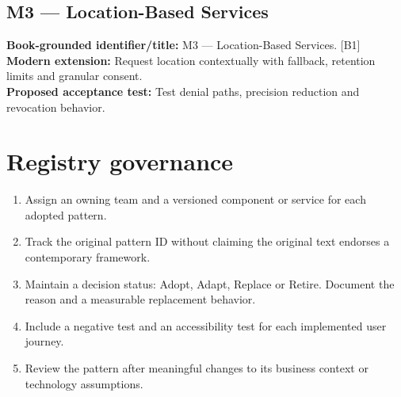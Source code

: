 \documentclass[11pt]{article}
\begin{document}
\subsection{M3 — Location-Based Services}
\noindent\textcolor{Ocean}{\textbf{Book-grounded identifier/title:}} M3 — Location-Based Services. [B1]\\
\textcolor{Mint}{\textbf{Modern extension:}} Request location contextually with fallback, retention limits and granular consent.\\
\textcolor{Amber}{\textbf{Proposed acceptance test:}} Test denial paths, precision reduction and revocation behavior.\medskip
\section{Registry governance}

\begin{enumerate}
\item Assign an owning team and a versioned component or service for each adopted pattern.
\item Track the original pattern ID without claiming the original text endorses a contemporary framework.
\item Maintain a decision status: Adopt, Adapt, Replace or Retire. Document the reason and a measurable replacement behavior.
\item Include a negative test and an accessibility test for each implemented user journey.
\item Review the pattern after meaningful changes to its business context or technology assumptions.
\end{enumerate}


\clearpage

\end{document}
